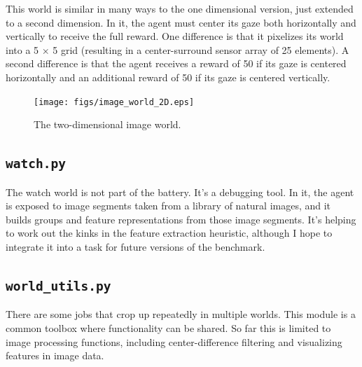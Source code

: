 This world is similar in many ways to the one dimensional version, just extended to a second dimension. In it, the agent must center its gaze both horizontally and vertically to receive the full reward. One difference is that it pixelizes its world into a 5 $\times$ 5 grid (resulting in a center-surround sensor array of 25 elements). A second difference is that the agent receives a reward of 50 if its gaze is centered horizontally and an additional reward of 50 if its gaze is centered vertically. 

\begin{figure}
\centering
\texttt{[image: figs/image\_world\_2D.eps]}
\caption{The two-dimensional image world.}
\label{image_2D}
\end{figure}


\subsection{\texttt{watch.py}}

The watch world is not part of the battery. It's a debugging tool. In it, the agent is exposed to image segments taken from a library of natural images, and it builds groups and feature representations from those image segments. It's helping to work out the kinks in the feature extraction heuristic, although I hope to integrate it into a task for future versions of the benchmark.


\subsection{\texttt{world\_utils.py}}

There are some jobs that crop up repeatedly in multiple worlds. This module is a common toolbox where functionality can be shared. So far this is limited to image processing functions, including center-difference filtering and visualizing features in image data.

